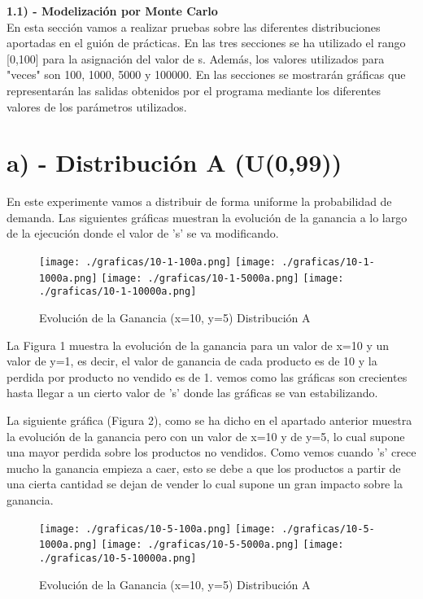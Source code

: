 \documentclass{article}
\begin{document}
	\textbf{1.1) - Modelización por Monte Carlo} \\
	
	\normalsize En esta sección vamos a realizar pruebas sobre las diferentes distribuciones aportadas en el guión de prácticas. En las tres secciones se ha utilizado el rango [0,100] para la asignación del valor de s. Además, los valores utilizados para "veces" son 100, 1000, 5000 y 100000. En las secciones se mostrarán gráficas que representarán las salidas obtenidos por el programa mediante los diferentes valores de los parámetros utilizados.  \\
	
	 \section*{a) - Distribución A (U(0,99))}
	 En este experimente vamos a distribuir de forma uniforme la probabilidad de demanda. Las siguientes gráficas muestran la evolución de la ganancia a lo largo de la ejecución donde el valor de 's' se va modificando. 
	 	
	 
	 \begin{figure}[h]
	 	\centering
	 	\texttt{[image: ./graficas/10-1-100a.png]}
	 	\texttt{[image: ./graficas/10-1-1000a.png]}
	 	\texttt{[image: ./graficas/10-1-5000a.png]}
	 	\texttt{[image: ./graficas/10-1-10000a.png]}
	 	\caption{Evolución de la Ganancia (x=10, y=5) Distribución A}
	 \end{figure} 
 
 	La Figura 1 muestra la evolución de la ganancia para un valor de x=10 y un valor de y=1, es decir, el valor de ganancia de cada producto es de 10 y la perdida por producto no vendido es de 1. vemos como las gráficas son crecientes hasta llegar a un cierto valor de 's' donde las gráficas se van estabilizando.
 	
 	\newpage
 	
 	La siguiente gráfica (Figura 2), como se ha dicho en el apartado anterior muestra la evolución de la ganancia pero con un valor de x=10 y de y=5, lo cual supone una mayor perdida sobre los productos no vendidos. Como vemos cuando 's' crece mucho la ganancia empieza a caer, esto se debe a que los productos a partir de una cierta cantidad se dejan de vender lo cual supone un gran impacto sobre la ganancia.
 
 
 	\begin{figure}[h]
 		\centering
 		\texttt{[image: ./graficas/10-5-100a.png]}
 		\texttt{[image: ./graficas/10-5-1000a.png]}
 		\texttt{[image: ./graficas/10-5-5000a.png]}
 		\texttt{[image: ./graficas/10-5-10000a.png]}
 		\caption{Evolución de la Ganancia (x=10, y=5) Distribución A}
 	\end{figure} 
 
\end{document}
